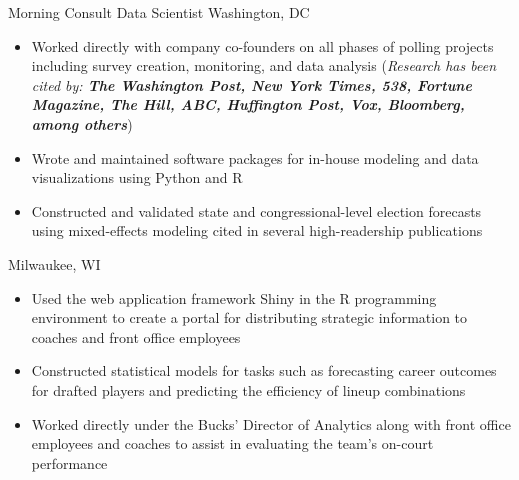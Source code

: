 \documentclass[11pt,a4paper,sans]{moderncv}        %
\begin{document}
  {Morning Consult Data Scientist}
  {}
  {Washington, DC}
  {}
  {
    \begin{itemize}
		\item{Worked directly with company co-founders on all phases of polling projects including survey creation, monitoring, and data analysis (\textit{Research has been cited by: \textbf{The Washington Post, New York Times, 538, Fortune Magazine, The Hill, ABC, Huffington Post, Vox, Bloomberg, among others}})}
 		\item{Wrote and maintained software packages for in-house modeling and data visualizations using Python and R}
		\item{Constructed and validated state and congressional-level election forecasts using mixed-effects modeling cited in several high-readership publications}
    \end{itemize}
  }

  {}
  {Milwaukee, WI}
  {}
  {
    \begin{itemize}
      \item{Used the web application framework Shiny in the R programming environment to create a portal for distributing strategic information to coaches and front office employees}
      \item{Constructed statistical models for tasks such as forecasting career outcomes for drafted players and predicting the efficiency of lineup combinations}
      \item{Worked directly under the Bucks' Director of Analytics along with front office employees and coaches to assist in evaluating the team's on-court performance}
    \end{itemize}
  }

\clearpage
\end{document}
